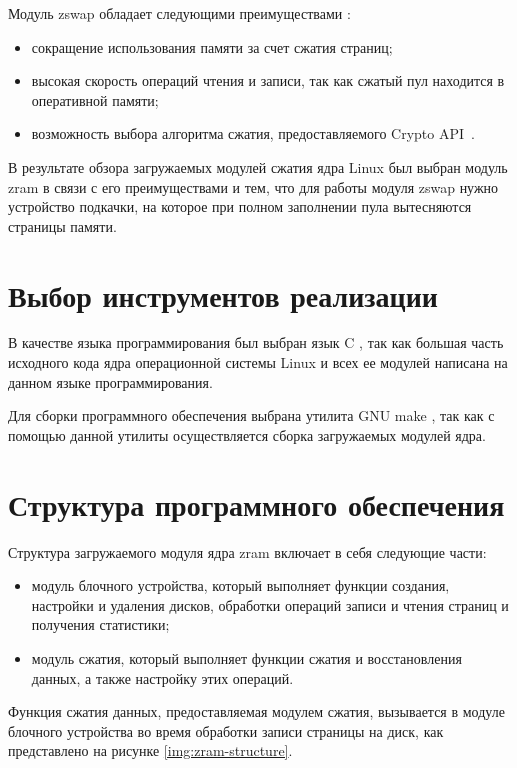 Модуль zswap обладает следующими преимуществами \cite{zswap}:

\begin{itemize}
	\item сокращение использования памяти за счет сжатия страниц;
	\item высокая скорость операций чтения и записи, так как сжатый пул находится в оперативной памяти;
    \item возможность выбора алгоритма сжатия, предоставляемого Crypto API~\cite{crypto}.
\end{itemize}

В результате обзора загружаемых модулей сжатия ядра Linux был выбран модуль zram в связи с его преимуществами и тем, что для работы модуля zswap нужно устройство подкачки, на которое при полном заполнении пула вытесняются страницы памяти.

\section{Выбор инструментов реализации}

В качестве языка программирования был выбран язык C \cite{c}, так как большая часть исходного кода ядра операционной системы Linux и всех ее модулей написана на данном языке программирования.

Для сборки программного обеспечения выбрана утилита GNU make \cite{make}, так как с помощью данной утилиты осуществляется сборка загружаемых модулей ядра.

\section{Структура программного обеспечения}

Структура загружаемого модуля ядра zram включает в себя следующие части:
\begin{itemize}
	\item модуль блочного устройства, который выполняет функции создания, настройки и удаления дисков, обработки операций записи и чтения страниц и получения статистики;
	\item модуль сжатия, который выполняет функции сжатия и восстановления данных, а также настройку этих операций.
\end{itemize}

Функция сжатия данных, предоставляемая модулем сжатия, вызывается в модуле блочного устройства во время обработки записи страницы на диск, как представлено на рисунке \ref{img:zram-structure}.

